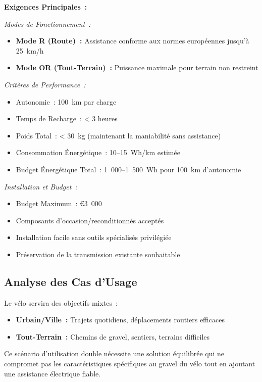 \documentclass[12pt,a4paper]{article}
\begin{document}
\textbf{Exigences Principales~:}

\textit{Modes de Fonctionnement~:}
\begin{itemize}
    \item \textbf{Mode R (Route)~:} Assistance conforme aux normes européennes jusqu'à 25~km/h \cite{eu-regulation}
    \item \textbf{Mode OR (Tout-Terrain)~:} Puissance maximale pour terrain non restreint
\end{itemize}

\textit{Critères de Performance~:}
\begin{itemize}
    \item Autonomie~: 100~km par charge
    \item Temps de Recharge~: < 3 heures
    \item Poids Total~: < 30~kg (maintenant la maniabilité sans assistance)
    \item Consommation Énergétique~: 10--15~Wh/km estimée
    \item Budget Énergétique Total~: 1~000--1~500~Wh pour 100~km d'autonomie
\end{itemize}

\textit{Installation et Budget~:}
\begin{itemize}
    \item Budget Maximum~: €3~000
    \item Composants d'occasion/reconditionnés acceptés
    \item Installation facile sans outils spécialisés privilégiée
    \item Préservation de la transmission existante souhaitable
\end{itemize}

\subsection{Analyse des Cas d'Usage}

Le vélo servira des objectifs mixtes~:
\begin{itemize}
    \item \textbf{Urbain/Ville~:} Trajets quotidiens, déplacements routiers efficaces
    \item \textbf{Tout-Terrain~:} Chemins de gravel, sentiers, terrains difficiles
\end{itemize}

Ce scénario d'utilisation double nécessite une solution équilibrée qui ne compromet pas les caractéristiques spécifiques au gravel du vélo tout en ajoutant une assistance électrique fiable.
\end{document}
